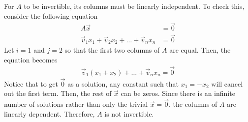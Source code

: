 \documentclass[letterpaper,12pt]{report}
\begin{document}
For $A$ to be invertible, its columns must be linearly independent. To check this, consider the following equation
\begin{align*}
  A\vec{x} &= \vec{0} \\
  \vec{v}_{1}x_{1} + \vec{v}_{2}x_{2} + \ldots + \vec{v}_{n}x_{n} &= \vec{0}
\end{align*}
Let $i = 1$ and $j = 2$ so that the first two columns of $A$ are equal. Then, the equation becomes
\begin{align*}
  \vec{v}_{1}(x_{1} + x_{2}) + \ldots + \vec{v}_{n}x_{n} = \vec{0}
\end{align*}
Notice that to get $\vec{0}$ as a solution, any constant such that $x_{1} = -x_{2}$ will cancel out the first term. Then, the rest of $\vec{x}$ can be zeros. Since there is an infinite number of solutions rather than only the trivial $\vec{x} = \vec{0}$, the columns of $A$ are linearly dependent. Therefore, $A$ is not invertible.
\end{document}
